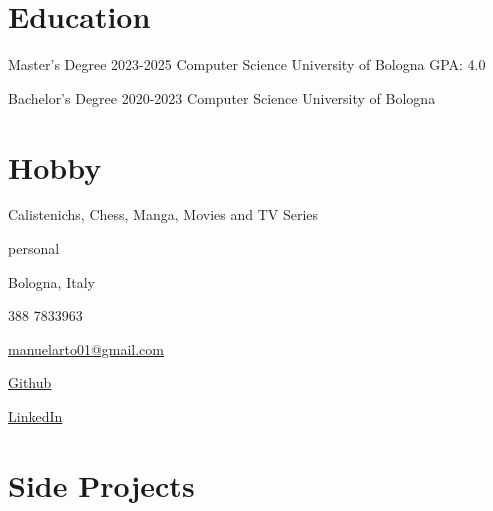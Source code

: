 \documentclass{tccv}
\begin{document}
\section{Education}

\begin{yearlist}

\item[Master's Degree]{2023-2025}
     {Computer Science}
     {University of Bologna \newline GPA: 4.0}

\item[Bachelor's Degree]{2020-2023}
    {Computer Science}
    {University of Bologna}

\end{yearlist}

\section{Hobby}

Calistenichs, Chess, Manga, Movies and TV Series


\newpage

\begin{keyvaluelist}{personal}
    \item[\faHome] Bologna, Italy
    \item[\faPhone] 388 7833963
    \item[\faEnvelope] \href{mailto:manuelarto01@gmail.com}{manuelarto01@gmail.com}
    \item[\faGithub] \href{https://github.com/manuelarto}{Github}
    \item[\faLinkedin] \href{https://www.linkedin.com/in/manuel-arto-696012203/}{LinkedIn}
\end{keyvaluelist}


\section{Side Projects}
\end{document}
